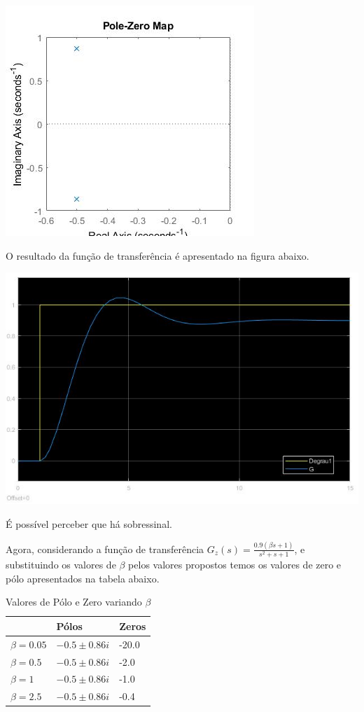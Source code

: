 \documentclass[
]{book}
\theoremstyle{definition}
\theoremstyle{definition}
\theoremstyle{definition}
\theoremstyle{remark}
\begin{document}
\includegraphics{Imagens/Lab2/prob5.jpg}

O resultado da função de transferência é apresentado na figura abaixo.

\includegraphics{imagens/Lab2/prob5Sim.jpg}

É possível perceber que há sobressinal.

Agora, considerando a função de transferência \(G_z(s) = \frac {0.9(\beta s+1)}{s^2+s+1}\), e substituindo os valores de \(\beta\) pelos valores propostos temos os valores de zero e pólo apresentados na tabela abaixo.

\begin{table}

\caption{\label{tab:unnamed-chunk-7}Valores de Pólo e Zero variando $\beta$}
\centering
\begin{tabular}[t]{lll}
\toprule
  & Pólos & Zeros\\
\midrule
$\beta = 0.05$ & {$-0.5 \pm 0.86i$} & -20.0\\
$\beta = 0.5$ & {$-0.5 \pm 0.86i$} & -2.0\\
$\beta = 1$ & {$-0.5 \pm 0.86i$} & -1.0\\
$\beta = 2.5$ & {$-0.5 \pm 0.86i$} & -0.4\\
\bottomrule
\end{tabular}
\end{table}
\end{document}
